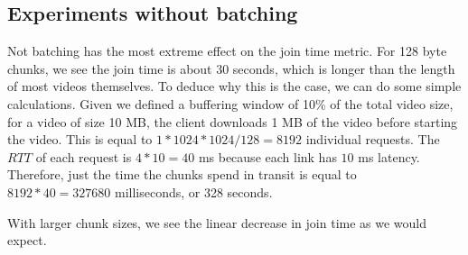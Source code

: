 \subsection{Experiments without batching} \label{sec:nobatch}

Not batching has the most extreme effect on the join time metric. For 128 byte
chunks, we see the join time is about 30 seconds, which is longer than the
length of most videos themselves. To deduce why this is the case, we can do some
simple calculations. Given we defined a buffering window of 10\% of the total
video size, for a video of size 10 MB, the client downloads 1 MB of the video
before starting the video. This is equal to $1 * 1024 * 1024 / 128 = 8192$
individual requests. The $RTT$ of each request is $4 * 10 = 40$ ms because
each link has $10$ ms latency. Therefore, just the time the chunks spend in
transit is equal to $8192 * 40 = 327680$ milliseconds, or 328 seconds.

With larger chunk sizes, we see the linear decrease in join time as we would
expect.



